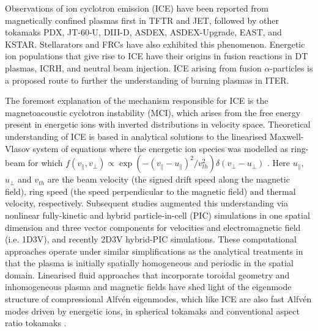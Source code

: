 \documentclass[12pt]{iopart}
\begin{document}
Observations of ion cyclotron emission (ICE) have been reported from magnetically confined plasmas first in TFTR\cite{Cauffman1995,Dendy1995} and JET\cite{Cottrell1988,Cottrell1993,Dendy1995}, followed by other tokamaks PDX\cite{Heidbrink1994}, JT-60-U\cite{Ichimura2008}, DIII-D\cite{Heidbrink2011}, ASDEX\cite{DInca2014}, ASDEX-Upgrade\cite{Ochoukov2018}, EAST\cite{Liu2020}, and KSTAR\cite{Chapman2017,Chapman2018}. Stellarators\cite{Saito2013} and FRCs\cite{Nicks2020} have also exhibited this phenomenon. Energetic ion populations that give rise to ICE have their origins in fusion reactions in DT plasmas\cite{Cottrell2000, Cauffman1995}, ICRH\cite{Cottrell2000}, and neutral beam injection\cite{Ochoukov2018}. ICE arising from fusion $\alpha$-particles is a proposed route to further the understanding of burning plasmas in ITER\cite{Dendy2015,McClements2015}. 

The foremost explanation of the mechanism responsible for ICE is the
magnetoacoustic cyclotron instability (MCI)\cite{Belikov1976}, which arises from
the free energy present in energetic ions with inverted distributions in
velocity space. Theoretical understanding of ICE is based in analytical
solutions to the linearised Maxwell-Vlasov system of equations\cite{Stix} where
the energetic ion species was modelled as ring-beam for which $f(v_\parallel,
v_\perp) \propto \exp(-(v_\parallel-u_\parallel)^2/ v_{th}^2)\delta(v_\perp -
u_\bot)$ \cite{Dendy1994, McClements1996}. Here $u_\parallel$, $u_\perp$ and
$v_{th}$ are the beam velocity (the signed drift speed along the magnetic
field), ring speed (the speed perpendicular to the magnetic field) and thermal
velocity, respectively. Subsequent studies augmented this understanding via
nonlinear fully-kinetic\cite{Cook2013,Chapman2017} and
hybrid\cite{Carbajal2014,Reman2019} particle-in-cell (PIC) simulations in one
spatial dimension and three vector components for velocities and electromagnetic
field (i.e. 1D3V), and recently 2D3V hybrid-PIC simulations\cite{Carbajal2021}. These
computational approaches operate under similar simplifications as the analytical
treatments in that the plasma is initially spatially homogeneous and periodic
in the spatial domain.
Linearised fluid approaches that incorporate toroidal geometry and
inhomogeneous plasma and magnetic fields have shed light of the eigenmode
structure of compressional Alfv{\'e}n eigenmodes, which like ICE are also fast
Alfv{\'e}n modes driven by energetic ions, in spherical
tokamaks\cite{Sharapov2014, Gorelenkov2016} and conventional aspect ratio
tokamaks \cite{Kolesnichenko2000, Fulop2000, Heidbrink2006}.
\end{document}

